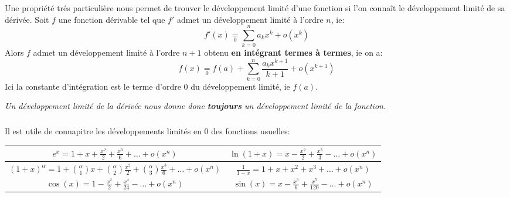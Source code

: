 Une propriété trés particulière nous permet de trouver le développement limité d'une fonction si l'on connaît le développement limité de sa dérivée.\+ 
Soit \(f\) une fonction dérivable tel que \(f'\) admet un développement limité à l'ordre \(n\), ie:
\[
   f'(x) \underset{0}{=} \sum_{k=0}^{n} a_kx^k + o(x^k)   
\]
Alors \(f\) admet un développement limité à l'ordre \(n + 1\) obtenu \textbf{en intégrant termes à termes}, ie on a:
\[
   f(x) \underset{0}{=} f(a) + \sum_{k=0}^{n} \frac{a_k x^{k+1}}{k+1} + o(x^{k+1})   
\]
Ici la constante d'intégration est le terme d'ordre 0 du développement limité, ie \(f(a)\).
\begin{center}
   \textit{
      Un développement limité de la dérivée nous donne donc \textbf{toujours}\+
      un développement limité de la fonction.
   }
\end{center}

\subsection*{}

Il est utile de connapitre les développements limités en \(0\) des fonctions usuelles:
\begin{center}
   \renewcommand{\arraystretch}{1.5}%
   \setlength\arrayrulewidth{0.8pt}

   \begin{tabular}{| c | c |}
   \hline
   \(e^x = 1 + x + \frac{x^2}{2} + \frac{x^3}{6} + \ldots + o(x^n)\) & \(\ln(1 + x) = x - \frac{x^2}{2} + \frac{x^3}{3} - \ldots + o(x^n) \)\\[1.5ex]
   \hline
   \((1+x)^\alpha = 1 + \binom{\alpha}{1} x + \binom{\alpha}{2}\frac{x^2}{2} + \binom{\alpha}{3}\frac{x^3}{6} + \ldots + o(x^n)\) & \(\frac{1}{1-x} = 1 + x + x^2 + x^3 + \ldots + o(x^n)\) \\[1.5ex]
   \hline
   \(\cos(x) = 1 - \frac{x^2}{2} + \frac{x^4}{24} - \ldots + o(x^n)\) & \(\sin(x) = x - \frac{x^3}{6} + \frac{x^5}{120} - \ldots + o(x^n)\) \\[1.5ex]   
   \hline
   \end{tabular}
\end{center} 
\chapter*{} %

